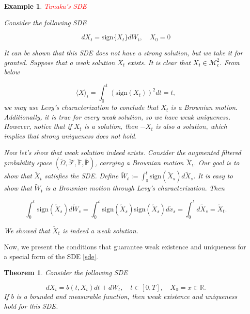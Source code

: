 \documentclass{article}
\newtheorem{theorem}{Theorem}
\newtheorem{ex}{Example}
\begin{document}
\begin{ex} \textcolor{red}{Tanaka's SDE}

Consider the following SDE

\begin{equation*}
dX_t = \text{sign}\{X_t\}dW_t, \quad X_0=0
\end{equation*}

It can be shown that this SDE does not have a strong solution, but we take it for granted. Suppose that a weak solution $X_t$ exists. It is clear that $X_t\in\mathcal{M}_c^2$. From below

\begin{equation*}
\langle X\rangle_t = \int_0^t(\text{sign}(X_t))^2dt=t,
\end{equation*}
we may use Levy's characterization to conclude that $X_t$ is a Brownian motion. Additionally, it is true for every weak solution, so we have weak uniqueness. However, notice that if $X_t$ is a solution, then $-X_t$ is also a solution, which implies that strong uniqueness does not hold.

Now let's show that weak solution indeed exists. Consider the augmented filtered probability space $(\tilde{\Omega},\tilde{\mathcal{F}},\tilde{\mathbb{F}},\tilde{\mathbb{P}})$, carrying a Brownian motion $\tilde{X}_t$. Our goal is to show that $\tilde{X}_t$ satisfies the SDE. Define $\tilde{W}_t:=\int^t_0\text{sign}(\tilde{X}_s)d\tilde{X}_s$. It is easy to show that $\tilde{W}_t$ is a Brownian motion through Levy's characterization. Then

\begin{equation*}
\int^t_0\text{sign}(\tilde{X}_s)d\tilde{W}_s=\int^t_0\text{sign}(\tilde{X}_s)\text{sign}(\tilde{X}_s)d\tilde{x}_s=\int^t_0d\tilde{X}_s=\tilde{X}_t.
\end{equation*}

We showed that $\tilde{X}_t$ is indeed a weak solution.
\end{ex}

Now, we present the conditions that guarantee weak existence and uniqueness for a special form of the SDE \eqref{sde}.

\begin{theorem}
Consider the following SDE

\begin{equation} \label{sde_weak_sol}
dX_t=b(t,X_t)dt+dW_t, \quad t\in[0,T], \quad X_0=x\in\mathbb{R}.
\end{equation}
If $b$ is a bounded and measurable function, then weak existence and uniqueness hold for this SDE.
\end{theorem}
\end{document}
